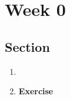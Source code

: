 \chapter{Week 0}
\setcounter{weekpage}{1}
\thispagestyle{plainweek}

\section{Section}

\begin{enumerate}



\item 


\newpage

\item \textbf{Exercise}



\end{enumerate}




